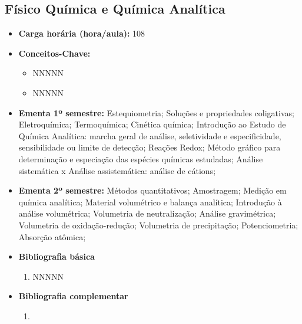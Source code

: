 \documentclass[11pt,fleqn]{book} %
\begin{document}
\subsection{Físico Química e Química Analítica}\label{disc:analitica}
\begin{itemize}
	\item \textbf{Carga horária (hora/aula):} 108
	\item \textbf{Conceitos-Chave:}
	\begin{itemize}
		\item NNNNN
		\item NNNNN
	\end{itemize}
	\item \textbf{Ementa 1º semestre:}
	Estequiometria;
	Soluções e propriedades coligativas;
	Eletroquímica;
	Termoquímica;
	Cinética química;
	Introdução ao Estudo de Química Analítica: marcha geral de análise, seletividade e especificidade, sensibilidade ou limite de detecção;
	Reações Redox; 
	Método gráfico para determinação e especiação das espécies químicas estudadas;
	Análise sistemática x Análise assistemática: análise de cátions; 
	\item \textbf{Ementa 2º semestre:}
	Métodos quantitativos;
	Amostragem; 
	Medição em química analítica; 
	Material volumétrico e balança analítica; 
	Introdução à análise volumétrica;
	Volumetria de neutralização;
	Análise gravimétrica; 
	Volumetria de oxidação-redução; 
	Volumetria de precipitação; 
	Potenciometria; 
	Absorção atômica;
	\item \textbf{Bibliografia básica}
	\begin{enumerate}
		\item NNNNN
	\end{enumerate}
	\item \textbf{Bibliografia complementar}
	\begin{enumerate}
		\item 
	\end{enumerate}	
\end{itemize}
\end{document}
